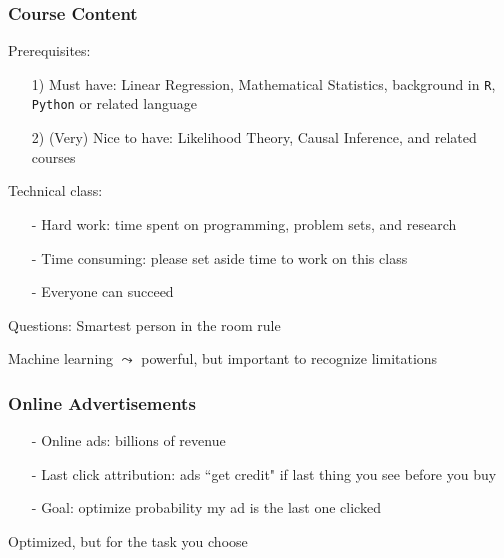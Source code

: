 \documentclass{beamer}
\numberwithin{equation}{section}
\begin{document}
\begin{frame}
\frametitle{Course Content}

Prerequisites:
\begin{itemize}
\item[1)] Must have: Linear Regression, Mathematical Statistics, background in {\tt R}, {\tt Python} or related language
\item[2)] (Very) Nice to have: Likelihood Theory, Causal Inference, and related courses
\end{itemize}  

Technical class:
\begin{itemize}
\item[-] Hard work: time spent on programming, problem sets, and research
\item[-] Time consuming: please set aside time to work on this class
\item[-] \alert{Everyone can succeed}
\end{itemize}  

Questions: Smartest person in the room rule



\end{frame}

\begin{frame}

\huge

Machine learning $\leadsto$ powerful, but important to recognize limitations


\end{frame}




\begin{frame}
\frametitle{Online Advertisements}



\begin{itemize}
\item[-] Online ads: \alert{billions} of revenue
\item[-] Last click attribution: ads ``get credit" if last thing you see before you buy
\item[-] Goal: optimize probability my ad is the last one clicked
\end{itemize}

Optimized, but for the task you choose


\end{frame}  
\end{document}
